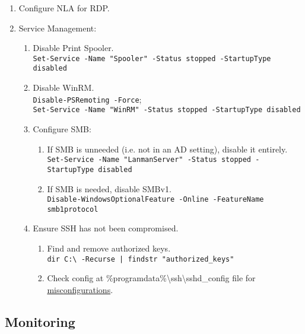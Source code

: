 \documentclass[12pt,letterpaper]{article}
\def\code#1{\textcolor{c2}{\texttt{#1}}}
\begin{document}
\begin{enumerate}
	\item Configure NLA for RDP.
	\item Service Management:
	\begin{enumerate}
		\item Disable Print Spooler. \\
			\code{Set-Service -Name "Spooler" -Status stopped -StartupType disabled}
		\item Disable WinRM. \\
			\code{Disable-PSRemoting -Force}; \\
			\code{Set-Service -Name "WinRM" -Status stopped -StartupType disabled}
		\item Configure SMB:
		\begin{enumerate}
			\item If SMB is unneeded (i.e. not in an AD setting), disable it entirely. \\
				\code{Set-Service -Name "LanmanServer" -Status stopped -StartupType disabled}
			\item If SMB is needed, disable SMBv1. \\
				\code{Disable-WindowsOptionalFeature -Online -FeatureName smb1protocol} 
		\end{enumerate}
		\item Ensure SSH has not been compromised.
		\begin{enumerate}
			\item Find and remove authorized keys. \\
				\code{dir C:\textbackslash{} -Recurse | findstr "authorized\_keys"}
			\item Check config at \%programdata\%\textbackslash{}ssh\textbackslash{}sshd\_config file for \href{https://learn.microsoft.com/en-us/windows-server/administration/openssh/openssh_server_configuration}{misconfigurations}. 
		\end{enumerate}
	\end{enumerate}
\end{enumerate}

\pagebreak

\subsection{Monitoring}
\end{document}
